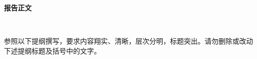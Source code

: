 \documentclass[a4paper,zihao=-4]{article}
\begin{document}

\setlength{\abovedisplayskip}{0pt}
\setlength{\belowdisplayskip}{0pt}

\begin{center}
	{\kaishu {} \textbf{报告正文} \vspace{-3ex}}
\end{center}  

\thispagestyle{empty} 　　　%

{\kaishu {}参照以下提纲撰写，要求内容翔实、清晰，层次分明，标题突出。}\alert{请勿删除或改动下述提纲标题及括号中的文字。\vspace{9bp}}




















\iffalse
项目申请人蔡祥睿正在参与研究一项国家自然科学基金重点项目：{\kaishu{融合地理空间
的人物行为与事件演化（U1936206），2020年1月1日-2023年12月31日，项目负责人：袁晓
洁}}。该项目旨在地理空间数据和互联网数据，研究人物表示、群体识别、重大事件分析和
预测等问题，其中人物表示学习、融合时空特征的时间预测与本项目的患者表示学习、可解
释预测模型等研究问题相关，可为本项目提供研究思路。此外，该项目的实施经验可作为本
项目的参考，为本项目的顺利开展和完成提供帮助。
\fi
\end{document}
